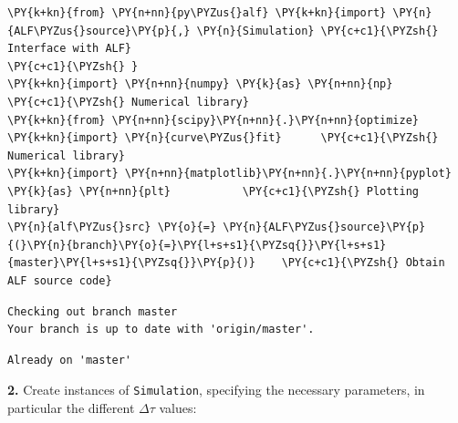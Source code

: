     \begin{tcolorbox}[breakable, size=fbox, boxrule=1pt, pad at break*=1mm,colback=cellbackground, colframe=cellborder]
\begin{Verbatim}[commandchars=\\\{\}]
\PY{k+kn}{from} \PY{n+nn}{py\PYZus{}alf} \PY{k+kn}{import} \PY{n}{ALF\PYZus{}source}\PY{p}{,} \PY{n}{Simulation} \PY{c+c1}{\PYZsh{} Interface with ALF}
\PY{c+c1}{\PYZsh{} }
\PY{k+kn}{import} \PY{n+nn}{numpy} \PY{k}{as} \PY{n+nn}{np}                        \PY{c+c1}{\PYZsh{} Numerical library}
\PY{k+kn}{from} \PY{n+nn}{scipy}\PY{n+nn}{.}\PY{n+nn}{optimize} \PY{k+kn}{import} \PY{n}{curve\PYZus{}fit}      \PY{c+c1}{\PYZsh{} Numerical library}
\PY{k+kn}{import} \PY{n+nn}{matplotlib}\PY{n+nn}{.}\PY{n+nn}{pyplot} \PY{k}{as} \PY{n+nn}{plt}           \PY{c+c1}{\PYZsh{} Plotting library}
\PY{n}{alf\PYZus{}src} \PY{o}{=} \PY{n}{ALF\PYZus{}source}\PY{p}{(}\PY{n}{branch}\PY{o}{=}\PY{l+s+s1}{\PYZsq{}}\PY{l+s+s1}{master}\PY{l+s+s1}{\PYZsq{}}\PY{p}{)}    \PY{c+c1}{\PYZsh{} Obtain ALF source code}
\end{Verbatim}
\end{tcolorbox}

    \begin{Verbatim}[commandchars=\\\{\}]
Checking out branch master
Your branch is up to date with 'origin/master'.
    \end{Verbatim}

    \begin{Verbatim}[commandchars=\\\{\}]
Already on 'master'
    \end{Verbatim}

    \textbf{2.} Create instances of \texttt{Simulation}, specifying the
necessary parameters, in particular the different \(\Delta \tau\)
values:

